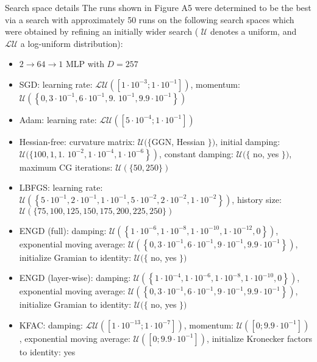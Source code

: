 \documentclass[10pt]{article}
\begin{document}
Search space details The runs shown in Figure A5 were determined to be the best via a search with approximately 50 runs on the following search spaces which were obtained by refining an initially wider search ( $\mathcal{U}$ denotes a uniform, and $\mathcal{L U}$ a log-uniform distribution):

\begin{itemize}
  \item $2 \rightarrow 64 \rightarrow 1$ MLP with $D=257$
  \item SGD: learning rate: $\mathcal{L U}\left(\left[1 \cdot 10^{-3} ; 1 \cdot 10^{-1}\right]\right)$, momentum: $\mathcal{U}\left(\left\{0,3 \cdot 10^{-1}, 6 \cdot 10^{-1}, 9\right.\right.$. $\left.\left.10^{-1}, 9.9 \cdot 10^{-1}\right\}\right)$
  \item Adam: learning rate: $\mathcal{L U}\left(\left[5 \cdot 10^{-4} ; 1 \cdot 10^{-1}\right]\right)$
  \item Hessian-free: curvature matrix: $\mathcal{U}(\{\mathrm{GGN}$, Hessian $\})$, initial damping: $\mathcal{U}(\{100,1,1$. $\left.\left.10^{-2}, 1 \cdot 10^{-4}, 1 \cdot 10^{-6}\right\}\right)$, constant damping: $\mathcal{U}(\{$ no, yes $\})$, maximum CG iterations: $\mathcal{U}(\{50,250\})$
  \item LBFGS: learning rate: $\mathcal{U}\left(\left\{5 \cdot 10^{-1}, 2 \cdot 10^{-1}, 1 \cdot 10^{-1}, 5 \cdot 10^{-2}, 2 \cdot 10^{-2}, 1 \cdot 10^{-2}\right\}\right)$, history size: $\mathcal{U}(\{75,100,125,150,175,200,225,250\})$
  \item ENGD (full): damping: $\mathcal{U}\left(\left\{1 \cdot 10^{-6}, 1 \cdot 10^{-8}, 1 \cdot 10^{-10}, 1 \cdot 10^{-12}, 0\right\}\right)$, exponential moving average: $\mathcal{U}\left(\left\{0,3 \cdot 10^{-1}, 6 \cdot 10^{-1}, 9 \cdot 10^{-1}, 9.9 \cdot 10^{-1}\right\}\right)$, initialize Gramian to identity: $\mathcal{U}(\{$ no, yes $\})$
  \item ENGD (layer-wise): damping: $\mathcal{U}\left(\left\{1 \cdot 10^{-4}, 1 \cdot 10^{-6}, 1 \cdot 10^{-8}, 1 \cdot 10^{-10}, 0\right\}\right)$, exponential moving average: $\mathcal{U}\left(\left\{0,3 \cdot 10^{-1}, 6 \cdot 10^{-1}, 9 \cdot 10^{-1}, 9.9 \cdot 10^{-1}\right\}\right)$, initialize Gramian to identity: $\mathcal{U}(\{$ no, yes $\})$
  \item KFAC: damping: $\mathcal{L U}\left(\left[1 \cdot 10^{-13} ; 1 \cdot 10^{-7}\right]\right)$, momentum: $\mathcal{U}\left(\left[0 ; 9.9 \cdot 10^{-1}\right]\right)$, exponential moving average: $\mathcal{U}\left(\left[0 ; 9.9 \cdot 10^{-1}\right]\right)$, initialize Kronecker factors to identity: yes

\end{itemize}
\end{document}
